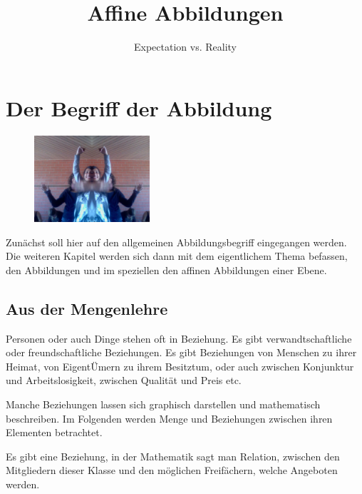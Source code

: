 \documentclass[%
11pt,%
twoside,%
titlepage,%
german,%
headsepline%
]{scrartcl}
\title{Affine Abbildungen}
\subtitle{Expectation vs. Reality}
\author{}
\date{}
\begin{document}
\maketitle
\tableofcontents
\cleardoublepage

\section{Der Begriff der Abbildung}

\begin{figure}
\vspace{-15pt}
  \begin{center}
    \includegraphics[width=0.382\textwidth]{miriam}
  \end{center}
\vspace{-22pt}
\end{figure}
Zunächst soll hier auf den allgemeinen Abbildungsbegriff eingegangen werden. Die weiteren Kapitel werden sich dann mit dem eigentlichem Thema befassen, den Abbildungen und im speziellen den affinen Abbildungen einer Ebene.

\subsection{Aus der Mengenlehre}
Personen oder auch Dinge stehen oft in Beziehung. Es gibt verwandtschaftliche oder freundschaftliche Beziehungen. Es gibt Beziehungen von Menschen zu ihrer Heimat, von Eigent\"Umern zu ihrem Besitztum, oder auch zwischen Konjunktur und Arbeitslosigkeit, zwischen Qualität und Preis etc.

Manche Beziehungen lassen sich graphisch darstellen und mathematisch beschreiben. Im Folgenden werden Menge und Beziehungen zwischen ihren Elementen betrachtet.

\begin{bsp}
Es gibt eine Beziehung, in der Mathematik sagt man Relation, zwischen den Mitgliedern dieser Klasse und den möglichen Freifächern, welche Angeboten werden.
\end{bsp}
\end{document}
